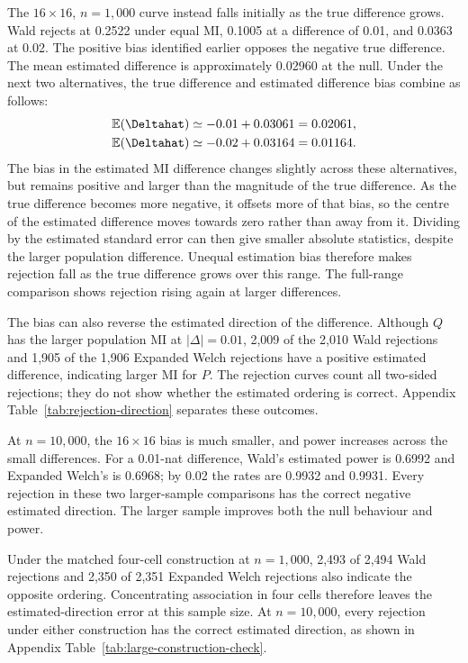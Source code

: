 The \(16\times16\), \(n=1{,}000\) curve instead falls initially as
the true difference grows. Wald rejects at 0.2522 under equal MI,
0.1005 at a difference of 0.01, and 0.0363 at 0.02. The positive bias
identified earlier opposes the negative true difference. The mean
estimated difference is approximately 0.02960 at the null. Under the
next two alternatives, the true difference and estimated difference
bias combine as follows:
\begin{align}
 \mathbb{E}(\Deltahat)&\simeq-0.01+0.03061=0.02061,\\
 \mathbb{E}(\Deltahat)&\simeq-0.02+0.03164=0.01164.
 \label{eq:focused-detection-bias-shift}
\end{align}
The bias in the estimated MI difference changes slightly across these
alternatives, but remains
positive and larger than the magnitude of the true difference. As the
true difference becomes more negative, it offsets more of that bias,
so the centre of the estimated difference moves towards zero
rather than away from it. Dividing by the estimated standard error
can then give smaller absolute statistics, despite the larger population
difference. Unequal estimation bias therefore makes rejection fall as
the true difference grows over this range. The full-range comparison
shows rejection rising again at larger differences.

The bias can also reverse the estimated direction of the difference.
Although \(Q\) has the larger population MI at \(|\Delta|=0.01\),
2,009 of the 2,010 Wald rejections and 1,905 of the 1,906 Expanded
Welch rejections have a positive estimated difference, indicating larger
MI for \(P\). The rejection curves count all two-sided rejections;
they do not show whether the estimated ordering is correct.
Appendix Table~\ref{tab:rejection-direction} separates these outcomes.

At \(n=10{,}000\), the \(16\times16\) bias is much smaller, and
power increases across the small differences. For a 0.01-nat difference,
Wald's estimated power is 0.6992 and Expanded Welch's is 0.6968; by 0.02
the rates are 0.9932 and 0.9931. Every rejection in these two larger-sample
comparisons has the correct negative estimated direction. The larger
sample improves both the null behaviour and power.

Under the matched four-cell construction at \(n=1{,}000\),
2,493 of 2,494 Wald rejections and 2,350 of 2,351 Expanded Welch rejections
also indicate the opposite ordering. Concentrating association in four
cells therefore leaves the estimated-direction error at this sample size.
At \(n=10{,}000\), every rejection under either construction has the
correct estimated direction, as shown in Appendix
Table~\ref{tab:large-construction-check}.

